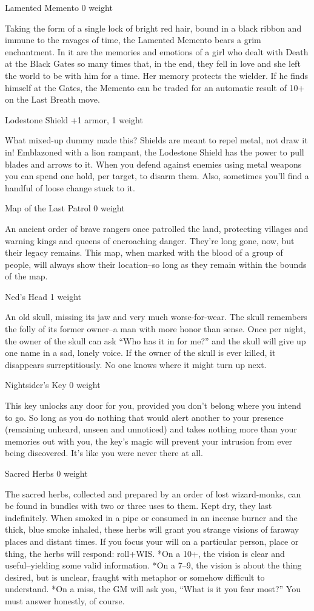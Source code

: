  Lamented Memento 0 weight


 Taking the form of a single lock of bright red hair, bound in a black ribbon and immune to the ravages of time, the Lamented Memento bears a grim enchantment. In it are the memories and emotions of a girl who dealt with Death at the Black Gates so many times that, in the end, they fell in love and she left the world to be with him for a time. Her memory protects the wielder. If he finds himself at the Gates, the Memento can be traded for an automatic result of 10+ on the Last Breath move.


 Lodestone Shield +1 armor, 1 weight


 What mixed-up dummy made this? Shields are meant to repel metal, not draw it in! Emblazoned with a lion rampant, the Lodestone Shield has the power to pull blades and arrows to it. When you defend against enemies using metal weapons you can spend one hold, per target, to disarm them. Also, sometimes you'll find a handful of loose change stuck to it.


 Map of the Last Patrol 0 weight


 An ancient order of brave rangers once patrolled the land, protecting villages and warning kings and queens of encroaching danger. They're long gone, now, but their legacy remains. This map, when marked with the blood of a group of people, will always show their location--so long as they remain within the bounds of the map. 


 Ned's Head 1 weight


 An old skull, missing its jaw and very much worse-for-wear. The skull remembers the folly of its former owner--a man with more honor than sense. Once per night, the owner of the skull can ask ``Who has it in for me?'' and the skull will give up one name in a sad, lonely voice. If the owner of the skull is ever killed, it disappears surreptitiously. No one knows where it might turn up next.


 Nightsider's Key 0 weight


 This key unlocks any door for you, provided you don't belong where you intend to go. So long as you do nothing that would alert another to your presence (remaining unheard, unseen and unnoticed) and takes nothing more than your memories out with you, the key's magic will prevent your intrusion from ever being discovered. It's like you were never there at all.


 Sacred Herbs 0 weight


 The sacred herbs, collected and prepared by an order of lost wizard-monks, can be found in bundles with two or three uses to them. Kept dry, they last indefinitely. When smoked in a pipe or consumed in an incense burner and the thick, blue smoke inhaled, these herbs will grant you strange visions of faraway places and distant times. If you focus your will on a particular person, place or thing, the herbs will respond: roll+WIS. *On a 10+, the vision is clear and useful--yielding some valid information. *On a 7--9, the vision is about the thing desired, but is unclear, fraught with metaphor or somehow difficult to understand. *On a miss, the GM will ask you, ``What is it you fear most?'' You must answer honestly, of course.



